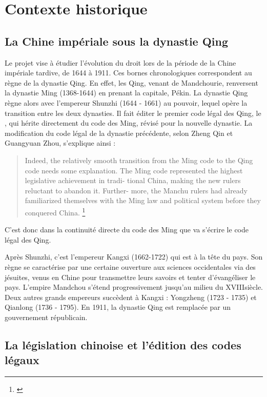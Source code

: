 \section{Contexte historique}
    \subsection{La Chine impériale sous la dynastie Qing}

Le projet \COREL vise à étudier l'évolution du droit lors de la période de la Chine impériale tardive, de 1644 à 1911. Ces bornes chronologiques correspondent au règne de la dynastie Qing. En effet, les Qing, venant de Mandchourie, renversent la dynastie Ming (1368-1644) en prenant la capitale, Pékin. La dynastie Qing règne alors avec l'empereur Shunzhi (1644 - 1661) au pouvoir, lequel opère la transition entre les deux dynasties. Il fait éditer le premier code légal des Qing, le \dqlj, qui hérite directement du code des Ming, révisé pour la nouvelle dynastie. La modification du code légal de la dynastie précédente, selon Zheng Qin et Guangyuan Zhou, s'explique ainsi : 

\begin{quote}
    Indeed, the relatively smooth transition
 from the Ming code to the Qing code needs some explanation. The
 Ming code represented the highest legislative achievement in tradi-
 tional China, making the new rulers reluctant to abandon it. Further-
 more, the Manchu rulers had already familiarized themselves with the
 Ming law and political system before they conquered China. \footnote{\cite{qin_pursuing_1995}}
\end{quote}
C'est donc dans la continuité directe du code des Ming que va s'écrire le code légal des Qing.

Après Shunzhi, c'est l'empereur Kangxi (1662-1722) qui est à la tête du pays. Son règne se caractérise par une certaine ouverture aux sciences occidentales via des jésuites, venus en Chine pour transmettre leurs savoirs et tenter d'évangéliser le pays. L'empire Mandchou s'étend progressivement jusqu'au milieu du XVIII\ieme siècle. Deux autres grands empereurs succèdent à Kangxi : Yongzheng (1723 - 1735) et Qianlong (1736 - 1795). En 1911, la dynastie Qing est remplacée par un gouvernement républicain.

\subsection{La législation chinoise et l’édition des codes légaux}

